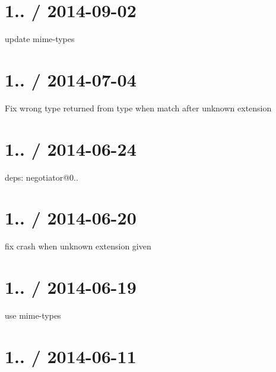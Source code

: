 \section*{1.. / 2014-\/09-\/02 }


\begin{DoxyItemize}
\item update {\ttfamily mime-\/types}
\end{DoxyItemize}

\section*{1.. / 2014-\/07-\/04 }


\begin{DoxyItemize}
\item Fix wrong type returned from {\ttfamily type} when match after unknown extension
\end{DoxyItemize}

\section*{1.. / 2014-\/06-\/24 }


\begin{DoxyItemize}
\item deps\+: negotiator@0..
\end{DoxyItemize}

\section*{1.. / 2014-\/06-\/20 }


\begin{DoxyItemize}
\item fix crash when unknown extension given
\end{DoxyItemize}

\section*{1.. / 2014-\/06-\/19 }


\begin{DoxyItemize}
\item use {\ttfamily mime-\/types}
\end{DoxyItemize}

\section*{1.. / 2014-\/06-\/11 }


